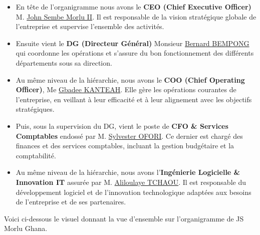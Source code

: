 \begin{itemize}
    \item En tête de l'organigramme nous avons le  \textbf{CEO (Chief Executive Officer)} M. \href{https://jsmorlu.com.gh/our-team/john-sembe-morlu-ii/}{John Sembe Morlu II}. Il est responsable de la vision stratégique globale de l’entreprise et supervise l’ensemble des activités.

    \item Ensuite vient le \textbf{DG (Directeur Général)} Monsieur \href{https://jsmorlu.com.gh/our-team/bernard-bempong/}{Bernard BEMPONG} qui coordonne les opérations et s’assure du bon fonctionnement des différents départements sous sa direction.

    \item Au même niveau de la hiérarchie, nous avons le \textbf{COO (Chief Operating Officer)}, Me \href{https://jsmorlu.com.gh/our-team/gbadee-kanteah/}{Gbadee KANTEAH}. Elle gère les opérations courantes de l’entreprise, en veillant à leur efficacité et à leur alignement avec les objectifs stratégiques.

    \item Puis, sous la supervision du DG, vient le poste de \textbf{CFO \& Services Comptables} endossé par M. \href{https://jsmorlu.com.gh/our-team/sylvester-ofori/}{Sylvester OFORI}. Ce dernier est chargé des finances et des services comptables, incluant la gestion budgétaire et la comptabilité.

    \item Au même niveau de la hiérarchie, nous avons l'\textbf{Ingénierie Logicielle \& Innovation IT} assurée par M. \href{https://jsmorlu.com.gh/our-team/aliloulaye-tchaou/}{Aliloulaye TCHAOU}. Il est responsable du développement logiciel et de l'innovation technologique adaptées aux besoins de l’entreprise et de ses partenaires.
\end{itemize}

\vspace{0.5cm}

Voici ci-dessous le visuel donnant la vue d'ensemble sur l'organigramme de JS Morlu Ghana. \\

